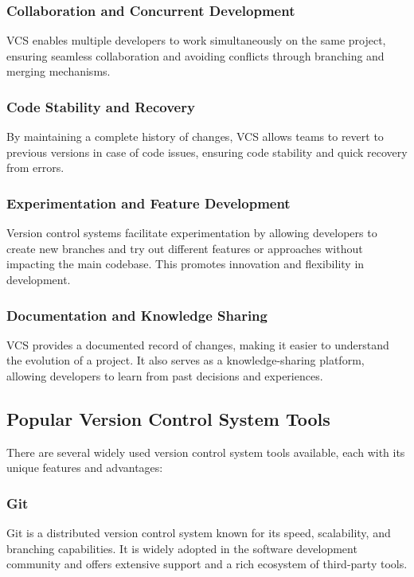 \subsubsection*{Collaboration and Concurrent Development}
VCS enables multiple developers to work simultaneously on the same project, ensuring seamless collaboration and avoiding conflicts through branching and merging mechanisms.

\subsubsection*{Code Stability and Recovery}
By maintaining a complete history of changes, VCS allows teams to revert to previous versions in case of code issues, ensuring code stability and quick recovery from errors.

\subsubsection*{Experimentation and Feature Development}
Version control systems facilitate experimentation by allowing developers to create new branches and try out different features or approaches without impacting the main codebase. This promotes innovation and flexibility in development.

\subsubsection*{Documentation and Knowledge Sharing}
VCS provides a documented record of changes, making it easier to understand the evolution of a project. It also serves as a knowledge-sharing platform, allowing developers to learn from past decisions and experiences.

\subsection*{Popular Version Control System Tools}

There are several widely used version control system tools available, each with its unique features and advantages:

\subsubsection*{Git}
Git is a distributed version control system known for its speed, scalability, and branching capabilities. It is widely adopted in the software development community and offers extensive support and a rich ecosystem of third-party tools.


